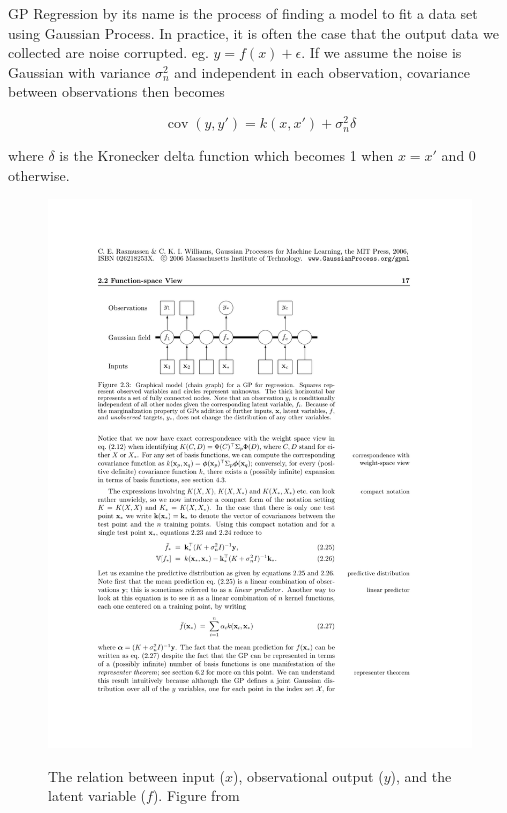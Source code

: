 \documentclass[14pt]{report}
\numberwithin{equation}{chapter}
\begin{document}
\begin{spacing}{2}
GP Regression by its name is the process of finding a model to fit a data set using Gaussian Process. In practice, it is often the case that the output data we collected are noise corrupted. eg. $y = f(x)+ \epsilon$. If we assume the noise is Gaussian with variance $\sigma_n^2$ and independent in each observation, covariance between observations then becomes

\begin{equation}
\label{cov_y}
\operatorname{cov}(y,y\prime) = k(x,x\prime) + \sigma_n^2\delta
\end{equation}

where $\delta$ is the Kronecker delta function which becomes 1 when $x = x\prime$ and 0 otherwise.

\begin{figure}[h]
\centering
\includegraphics{Regression_model.pdf}
\label{regression_model}
\caption{The relation between input ($x$), observational output ($y$), and the latent variable ($f$). \newline Figure from \cite{RW}}
\end{figure}



\end{spacing}
\end{document}
